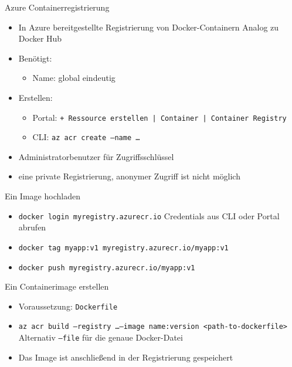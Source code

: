 \begin{flashcard}[Definition]{Azure Containerregistrierung}
    \begin{itemize}
        \item In Azure bereitgestellte Registrierung von Docker-Containern\newline
            Analog zu Docker Hub
        \item Benötigt:
            \begin{itemize}
                \item Name: global eindeutig
            \end{itemize}
        \item Erstellen:
            \begin{itemize}
                \item Portal: \texttt{+ Ressource erstellen | Container | Container Registry}
                \item CLI: \texttt{az acr create --name \ldots}
            \end{itemize}
        \item Administratorbenutzer für Zugriffsschlüssel
        \item[!] eine private Registrierung, anonymer Zugriff ist nicht möglich
    \end{itemize}
\end{flashcard}

\begin{flashcard}[Definition]{Ein Image hochladen}
    \begin{itemize}
        \item \texttt{docker login myregistry.azurecr.io}\newline
            Credentials aus CLI oder Portal abrufen
        \item \texttt{docker tag myapp:v1 myregistry.azurecr.io/myapp:v1}
        \item \texttt{docker push myregistry.azurecr.io/myapp:v1}
    \end{itemize}
\end{flashcard}

\begin{flashcard}[Definition]{Ein Containerimage erstellen}
    \begin{itemize}
        \item Voraussetzung: \texttt{Dockerfile}
        \item \texttt{az acr build --registry \ldots --image name:version <path-to-dockerfile>}\newline
            Alternativ \texttt{--file} für die genaue Docker-Datei
        \item Das Image ist anschließend in der Registrierung gespeichert
    \end{itemize}
\end{flashcard}

